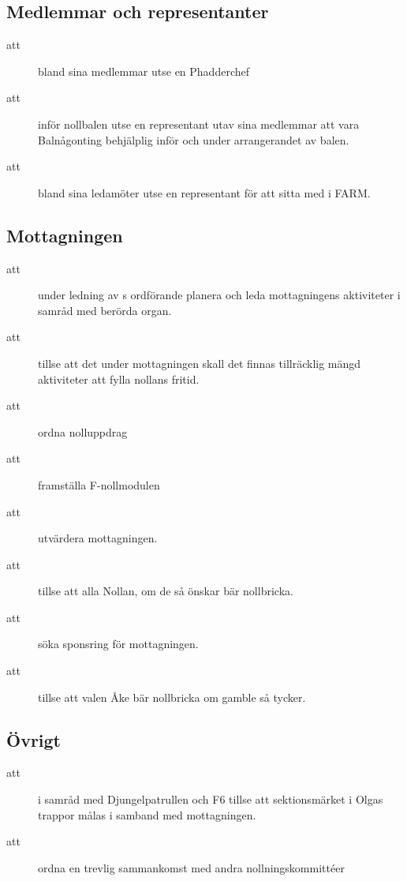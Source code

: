 \subsection{Medlemmar och representanter}
\begin{description}

\item[att] bland sina medlemmar utse en Phadderchef

\item[att] inför nollbalen utse en representant utav sina medlemmar att vara Balnågonting behjälplig inför och under arrangerandet av balen.

\item[att] bland sina ledamöter utse en representant för att sitta med i FARM.
\end{description}

\subsection{Mottagningen}
\begin{description}
\item[att] under ledning av \forening s ordförande planera och leda mottagningens aktiviteter i samråd med berörda organ.

\item[att] tillse att det under mottagningen skall det finnas tillräcklig mängd aktiviteter att fylla nollans fritid.

\item[att] ordna nolluppdrag

\item[att] framställa F-nollmodulen

\item[att] utvärdera mottagningen.

\item[att] tillse att alla Nollan, om de
så önskar bär nollbricka.

\item[att] söka sponsring för mottagningen.

\item[att] tillse att valen Åke bär nollbricka om gamble så tycker.

\end{description}

\subsection{Övrigt}
\begin{description}
\item[att] i samråd med Djungelpatrullen och F6 tillse att sektionsmärket i Olgas trappor målas i samband med mottagningen.

\item[att] ordna en trevlig sammankomst med andra nollningskommittéer


\end{description}

